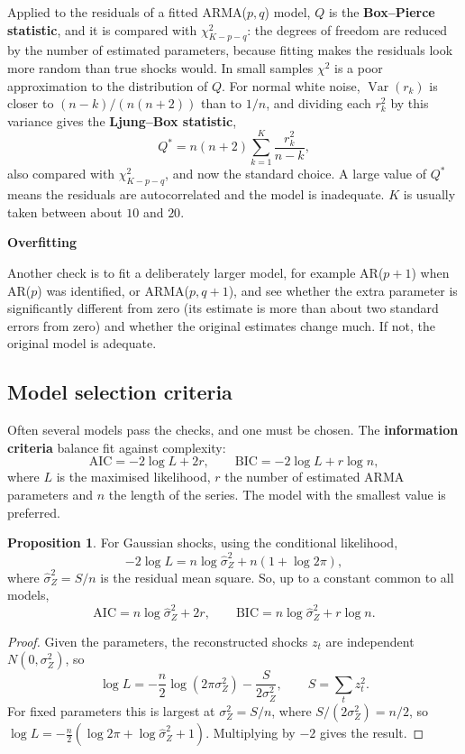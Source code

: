 \documentclass[11pt,a4paper]{article}
\theoremstyle{definition}
\newtheorem{prop}[thm]{Proposition}
\newcommand{\subhead}[1]{%
  \par\medskip\noindent\textbf{#1}\par\nobreak\smallskip}
\DeclareMathOperator{\Var}{Var}
\begin{document}
Applied to the residuals of a fitted ARMA($p, q$) model, $Q$ is the \textbf{Box--Pierce statistic}, and it is
compared with $\chi^2_{K-p-q}$: the degrees of freedom are reduced by the number of estimated parameters, because fitting
makes the residuals look more random than true shocks would. In small samples $\chi^2$ is a poor approximation to
the distribution of $Q$. For normal white noise, $\Var(r_k)$ is closer to $(n - k)/(n(n + 2))$ than to $1/n$, and dividing each $r_k^2$ by
this variance gives the \textbf{Ljung--Box statistic},
\[
Q^* = n(n + 2)\sum_{k=1}^K\frac{r_k^2}{n - k} ,
\]
also compared with $\chi^2_{K-p-q}$, and now the standard choice. A large value of $Q^*$ means the residuals are
autocorrelated and the model is inadequate. $K$ is usually taken between about $10$ and $20$.

\subhead{Overfitting}
Another check is to fit a deliberately larger model, for example AR($p + 1$) when AR($p$) was identified, or
ARMA($p, q + 1$), and see whether the extra parameter is significantly different from zero (its estimate is more
than about two standard errors from zero) and whether the original estimates change much. If not, the
original model is adequate.

\subsection{Model selection criteria}
Often several models pass the checks, and one must be chosen. The \textbf{information criteria} balance fit
against complexity:
\[
\text{AIC} = -2\log L + 2r , \qquad \text{BIC} = -2\log L + r\log n ,
\]
where $L$ is the maximised likelihood, $r$ the number of estimated ARMA parameters and $n$ the length of the series.
The model with the smallest value is preferred.

\begin{prop}\label{prop:aic-gaussian}
For Gaussian shocks, using the conditional likelihood,
\[
-2\log L = n\log\hat\sigma_Z^2 + n(1 + \log2\pi) ,
\]
where $\hat\sigma_Z^2 = S/n$ is the residual mean square. So, up to a constant common to all models,
\[
\text{AIC} = n\log\hat\sigma_Z^2 + 2r , \qquad \text{BIC} = n\log\hat\sigma_Z^2 + r\log n .
\]
\end{prop}

\begin{proof}
Given the parameters, the reconstructed shocks $z_t$ are independent $N(0, \sigma_Z^2)$, so
\[
\log L = -\frac n2\log(2\pi\sigma_Z^2) - \frac{S}{2\sigma_Z^2} , \qquad S = \sum_tz_t^2 .
\]
For fixed parameters this is largest at $\sigma_Z^2 = S/n$, where $S/(2\sigma_Z^2) = n/2$, so $\log L = -\frac n2(\log2\pi + \log\hat\sigma_Z^2 + 1)$. Multiplying by $-2$ gives the
result.
\end{proof}
\end{document}
